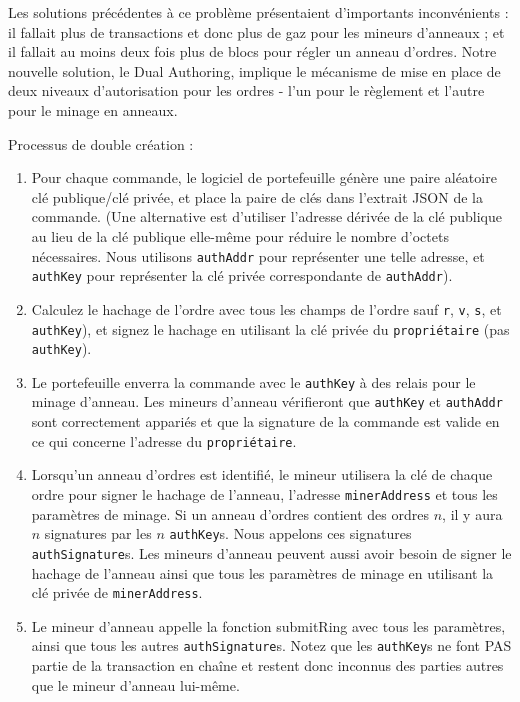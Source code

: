 \documentclass[UTF8,nofonts]{article}
\begin{document}
\begin{multicols}{2}
Les solutions précédentes à ce problème présentaient d'importants inconvénients : il fallait plus de transactions et donc plus de gaz pour les mineurs d’anneaux ; et il fallait au moins deux fois plus de blocs pour régler un anneau d'ordres.  Notre nouvelle solution, le Dual Authoring\cite{dualauthor}, implique le mécanisme de mise en place de deux niveaux d'autorisation pour les ordres - l'un pour le règlement et l'autre pour le minage en anneaux.

Processus de double création :

\begin{enumerate}

	\item Pour chaque commande, le logiciel de portefeuille génère une paire aléatoire clé publique/clé privée, et place la paire de clés dans l’extrait JSON de la commande. (Une alternative est d'utiliser l'adresse dérivée de la clé publique au lieu de la clé publique elle-même pour réduire le nombre d’octets nécessaires. Nous utilisons \verb|authAddr| pour représenter une telle adresse, et \verb|authKey| pour représenter la clé privée correspondante de \verb|authAddr|).

	\item Calculez le hachage de l'ordre avec tous les champs de l'ordre sauf \verb|r|, \verb|v|, \verb|s|, et \verb|authKey|), et signez le hachage en utilisant la clé privée du \verb|propriétaire| (pas \verb|authKey|).

	\item Le portefeuille enverra la commande avec le \verb|authKey| à des relais pour le minage d’anneau. Les mineurs d’anneau vérifieront que \verb|authKey| et \verb|authAddr| sont correctement appariés et que la signature de la commande est valide en ce qui concerne l'adresse du \verb|propriétaire|.

	\item Lorsqu'un anneau d’ordres est identifié, le mineur utilisera la clé de chaque ordre pour signer le hachage de l'anneau, l'adresse \verb|minerAddress| et tous les paramètres de minage. Si un anneau d'ordres contient des ordres $n$, il y aura $n$ signatures par les $n$ \verb|authKey|s. Nous appelons ces signatures \verb|authSignature|s. Les mineurs d’anneau peuvent aussi avoir besoin de signer le hachage de l'anneau ainsi que tous les paramètres de minage en utilisant la clé privée de \verb|minerAddress|.

	\item Le mineur d’anneau appelle la fonction submitRing avec tous les paramètres, ainsi que tous les autres \verb|authSignature|s. Notez que les \verb|authKey|s ne font PAS partie de la transaction en chaîne et restent donc inconnus des parties autres que le mineur d’anneau lui-même.



\end{enumerate}
\end{multicols}
\end{document}
